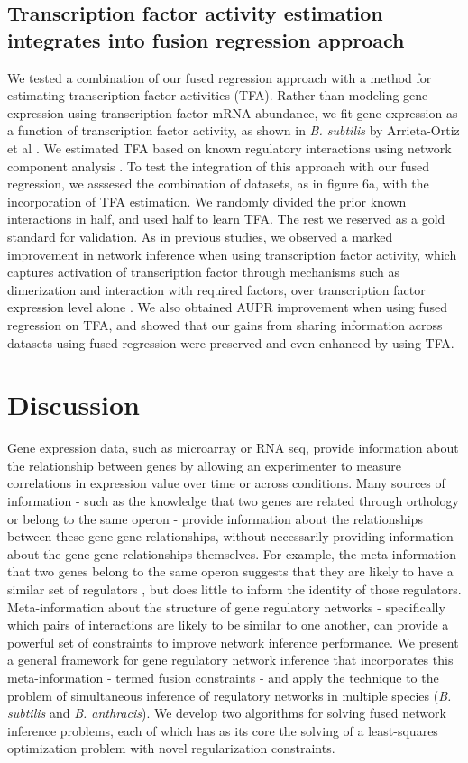 \documentclass[11pt]{article}
\begin{document}
\subsection{Transcription factor activity estimation integrates into fusion regression approach}
We tested a combination of our fused regression approach with a method for estimating transcription factor activities (TFA). Rather than modeling gene expression using transcription factor mRNA abundance, we fit gene expression as a function of transcription factor activity, as shown in \textit{B. subtilis} by Arrieta-Ortiz et al \cite{arrieta-ortiz_experimentally_2015}. We estimated TFA based on known regulatory interactions using network component analysis \cite{liao2003network}. To test the integration of this approach with our fused regression, we asssesed the combination of  datasets, as in figure 6a, with the incorporation of TFA estimation. We randomly divided the prior known interactions in half, and used half to learn TFA. The rest we reserved as a gold standard for validation. As in previous studies, we observed a marked improvement in network inference when using transcription factor activity, which captures activation of transcription factor through mechanisms such as dimerization and interaction with required factors, over transcription factor expression level alone \cite{fu_reconstructing_2011}. We also obtained AUPR improvement when using fused regression on TFA, and showed that our gains from sharing information across datasets using fused regression were preserved and even enhanced by using TFA. 

\section{Discussion}
Gene expression data, such as microarray or RNA seq, provide information about the relationship between genes by allowing an experimenter to measure correlations in expression value over time or across conditions. Many sources of information - such as the knowledge that two genes are related through orthology or belong to the same operon - provide information about the relationships between these gene-gene relationships, without necessarily providing information about the gene-gene relationships themselves. For example, the meta information that two genes belong to the same operon suggests that they are likely to have a similar set of regulators \cite{lawrence_shared_2002}, but does little to inform the identity of those regulators. Meta-information about the structure of gene regulatory networks - specifically which pairs of interactions are  likely to be similar to one another, can provide a powerful set of constraints to improve network inference performance. We present a general framework for gene regulatory network inference that incorporates this meta-information - termed fusion constraints - and apply the technique to the problem of simultaneous inference of regulatory networks in multiple species (\textit{B. subtilis} and \textit{B. anthracis}). We develop two algorithms for solving fused network inference problems, each of which has as its core the solving of a least-squares optimization problem with novel regularization constraints.
\end{document}
